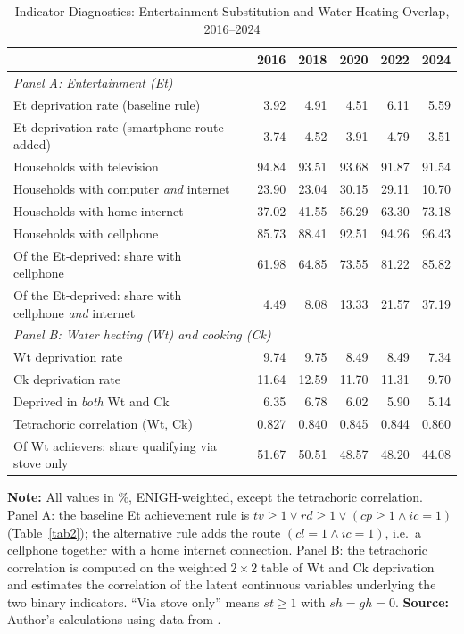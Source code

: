 \documentclass[11pt, a4paper]{article}
\begin{document}
\begin{table}[htb]
\centering
\caption{Indicator Diagnostics: Entertainment Substitution and Water-Heating Overlap, 2016--2024}
\small
\begin{tabularx}{\textwidth}{l X rrrrr}
\toprule
\toprule
 & & 2016 & 2018 & 2020 & 2022 & 2024 \\ \midrule
\multicolumn{7}{l}{\textit{Panel A: Entertainment (Et)}} \\[2pt]
Et deprivation rate (baseline rule)        & & 3.92 & 4.91 & 4.51 & 6.11 & 5.59 \\
Et deprivation rate (smartphone route added) & & 3.74 & 4.52 & 3.91 & 4.79 & 3.51 \\
\addlinespace
Households with television                 & & 94.84 & 93.51 & 93.68 & 91.87 & 91.54 \\
Households with computer \emph{and} internet & & 23.90 & 23.04 & 30.15 & 29.11 & 10.70 \\
Households with home internet              & & 37.02 & 41.55 & 56.29 & 63.30 & 73.18 \\
Households with cellphone                  & & 85.73 & 88.41 & 92.51 & 94.26 & 96.43 \\
\addlinespace
Of the Et-deprived: share with cellphone    & & 61.98 & 64.85 & 73.55 & 81.22 & 85.82 \\
Of the Et-deprived: share with cellphone \emph{and} internet & & 4.49 & 8.08 & 13.33 & 21.57 & 37.19 \\[4pt]
\multicolumn{7}{l}{\textit{Panel B: Water heating (Wt) and cooking (Ck)}} \\[2pt]
Wt deprivation rate                        & & 9.74 & 9.75 & 8.49 & 8.49 & 7.34 \\
Ck deprivation rate                        & & 11.64 & 12.59 & 11.70 & 11.31 & 9.70 \\
Deprived in \emph{both} Wt and Ck          & & 6.35 & 6.78 & 6.02 & 5.90 & 5.14 \\
Tetrachoric correlation (Wt, Ck)           & & 0.827 & 0.840 & 0.845 & 0.844 & 0.860 \\
Of Wt achievers: share qualifying via stove only & & 51.67 & 50.51 & 48.57 & 48.20 & 44.08 \\
\bottomrule
\end{tabularx}
\begin{justify}
\scriptsize
\textbf{Note:} All values in \%, ENIGH-weighted, except the tetrachoric correlation. Panel A: the baseline Et achievement rule is $tv \geq 1 \lor rd \geq 1 \lor (cp \geq 1 \land ic=1)$ (Table~\ref{tab2}); the alternative rule adds the route $(cl = 1 \land ic = 1)$, i.e.\ a cellphone together with a home internet connection. Panel B: the tetrachoric correlation is computed on the weighted $2\times2$ table of Wt and Ck deprivation and estimates the correlation of the latent continuous variables underlying the two binary indicators. ``Via stove only'' means $st \geq 1$ with $sh = gh = 0$. \textbf{Source:} Author's calculations using data from \textcite{enigh2016, enigh2018, enigh2020, enigh2022, enigh2024}.
\end{justify}
\label{tab:et_diag}
\end{table}
\end{document}

